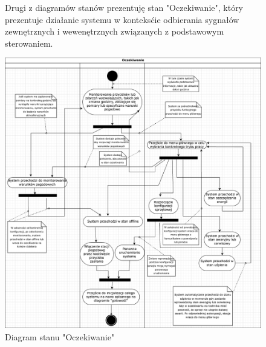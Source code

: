 \documentclass{article}
\begin{document}
\begin{figure}
    \centering
    \begin{minipage}{0.6\textwidth}
        \centering
        \large Drugi z diagramów stanów prezentuję stan "Oczekiwanie", który prezentuje działanie systemu w konteksćie odbierania sygnałów zewnętrznych i wewenętrznych związanych z podstawowym sterowaniem.
    \end{minipage}
    \includegraphics[scale=0.5]{oczekiwanie.png}
    \caption{Diagram stanu "Oczekiwanie"}
    \label{etykieta2}
\end{figure}
\end{document}
